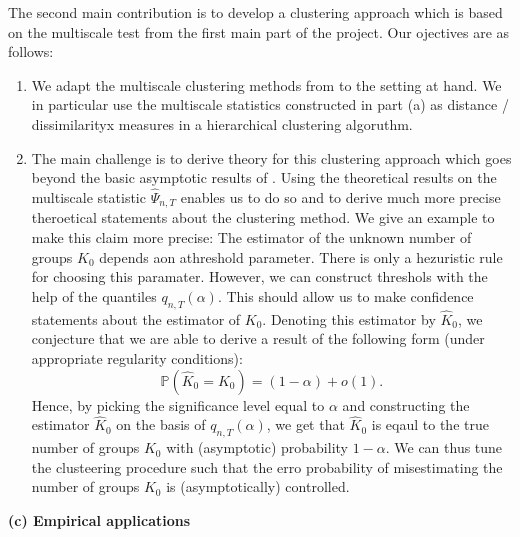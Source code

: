 \documentclass[a4paper,12pt]{article}
\begin{document}
\begin{itemize}[label=--,leftmargin=0.5cm]
\noindent The second main contribution is to develop a clustering approach which is based on the multiscale test from the first main part of the project. 
Our ojectives are as follows:
\begin{enumerate}[label=(\roman*),leftmargin=0.75cm]
\item We adapt the multiscale clustering methods from \cite{VogtLinton2018} to the setting at hand. We in particular use the multiscale statistics constructed in part (a) as distance / dissimilarityx measures in a hierarchical clustering algoruthm. 
\item  The main challenge is to derive theory for this clustering approach which goes beyond the basic asymptotic results of \cite{VogtLinton2018}. Using the theoretical results on the multiscale statistic $\hat{\Psi}_{n,T}$ enables us to do so and to derive much more precise theroetical statements about the clustering method. We give an example to make this claim more precise: The estimator of the unknown number of groups $K_0$ depends aon athreshold parameter. There is only a hezuristic rule for choosing this paramater. However, we can construct threshols with the help of the quantiles $q_{n,T}(\alpha)$. This should allow us to make confidence statements about the estimator of $K_0$. Denoting this estimator by $\hat{K}_0$, we conjecture that we are able to derive a result of the following form (under appropriate regularity conditions):
\[ \mathbb{P}( \hat{K}_0 = K_0 ) = (1-\alpha) + o(1). \] 
Hence, by picking the significance level equal to $\alpha$ and constructing the estimator $\hat{K}_0$ on the basis of $q_{n,T}(\alpha)$, we get that $\hat{K}_0$ is eqaul to the true number of groups $K_0$ with (asymptotic) probability $1-\alpha$. We can thus tune the clusteering procedure such that the erro probability of misestimating the number of groups $K_0$ is (asymptotically) controlled. 
\end{enumerate}
\vspace{5pt}


\noindent \textbf{(c) Empirical applications} 
\vspace{10pt}



\end{itemize}
\end{document}
